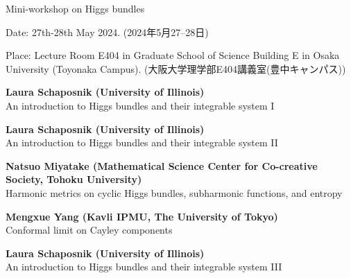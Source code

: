 \documentclass[dvipdfmx,a4paper,12pt]{article}
\theoremstyle{plain} %
\theoremstyle{definition} %
\begin{document}
\begin{center}
  {\Huge Mini-workshop on Higgs bundles}
 

  \end{center}
  
\vskip5mm
\begin{flushleft}
{ Date: 27th-28th May 2024. (2024年5月27--28日)}


{Place: Lecture Room E404 in Graduate School of Science Building E in Osaka University (Toyonaka Campus).}
{(大阪大学理学部E404講義室(豊中キャンパス))}

\end{flushleft}




\vskip3mm

\vskip3mm
\vskip1mm
{\bf Laura Schaposnik (University of Illinois)}\\
\hspace{11pt} An introduction to Higgs bundles and their integrable system I

{\bf Laura Schaposnik (University of Illinois)}\\
\hspace{11pt} An introduction to Higgs bundles and their integrable system II

{\bf Natsuo Miyatake (Mathematical Science Center for Co-creative Society, Tohoku University)}\\
\hspace{11pt} Harmonic metrics on cyclic Higgs bundles, subharmonic functions, and entropy

{\bf Mengxue Yang (Kavli IPMU, The University of Tokyo)}\\
\hspace{11pt} Conformal limit on Cayley components

\vskip1mm
{\bf Laura Schaposnik (University of Illinois)}\\
\hspace{11pt} An introduction to Higgs bundles and their integrable system III
\end{document}
